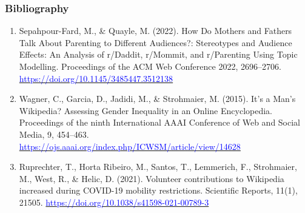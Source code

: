 \documentclass{beamer}
\begin{document}
\begin{frame}
    \frametitle{Bibliography}
    \tiny
    \begin{enumerate}
        \item Sepahpour-Fard, M., \& Quayle, M. (2022). How Do Mothers and Fathers Talk About Parenting to Different Audiences?: Stereotypes and Audience Effects: An Analysis of r/Daddit, r/Mommit, and r/Parenting Using Topic Modelling. Proceedings of the ACM Web Conference 2022, 2696–2706. \href{https://doi.org/10.1145/3485447.3512138}{\textcolor{blue}{https://doi.org/10.1145/3485447.3512138}}
        \item Wagner, C., Garcia, D., Jadidi, M., \& Strohmaier, M. (2015). It’s a Man’s Wikipedia? Assessing Gender Inequality in an Online Encyclopedia. Proceedings of the ninth International AAAI Conference of Web and Social Media, 9, 454–463. \href{https://ojs.aaai.org/index.php/ICWSM/article/view/14628}{\textcolor{blue}{https://ojs.aaai.org/index.php/ICWSM/article/view/14628}}
        \item Ruprechter, T., Horta Ribeiro, M., Santos, T., Lemmerich, F., Strohmaier, M., West, R., \& Helic, D. (2021). Volunteer contributions to Wikipedia increased during COVID-19 mobility restrictions. Scientific Reports, 11(1), 21505. \href{https://doi.org/10.1038/s41598-021-00789-3}{\textcolor{blue}{https://doi.org/10.1038/s41598-021-00789-3}}
    \end{enumerate}
    
\end{frame}
\end{document}
